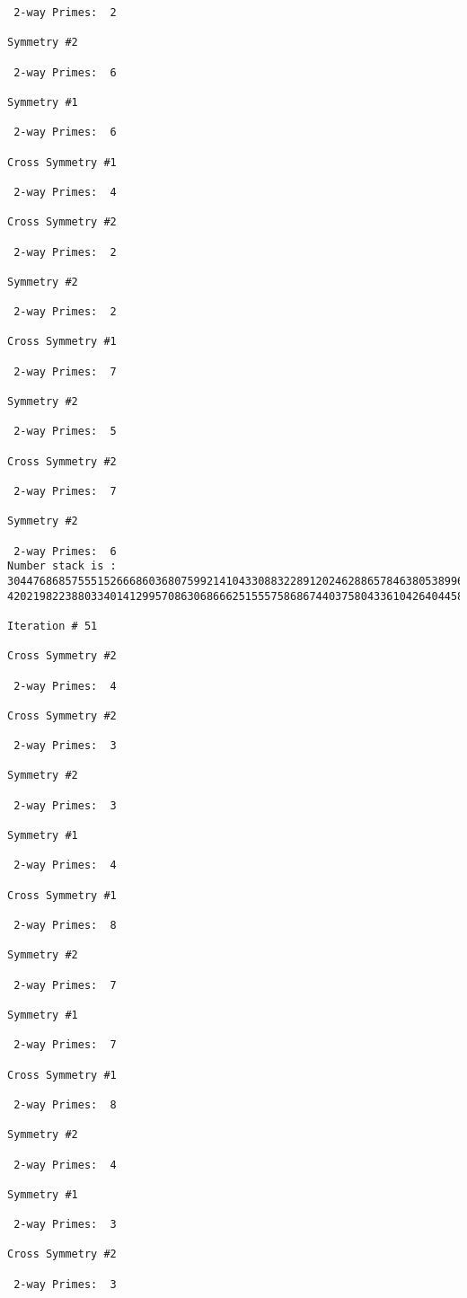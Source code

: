 {{{{\begin{verbatim}
 2-way Primes: 	2

Symmetry #2

 2-way Primes: 	6

Symmetry #1

 2-way Primes: 	6

Cross Symmetry #1

 2-way Primes: 	4

Cross Symmetry #2

 2-way Primes: 	2

Symmetry #2

 2-way Primes: 	2

Cross Symmetry #1

 2-way Primes: 	7

Symmetry #2

 2-way Primes: 	5

Cross Symmetry #2

 2-way Primes: 	7

Symmetry #2

 2-way Primes: 	6
Number stack is :
30447686857555152666860368075992141043308832289120246288657846380538996794608835958544046240163340857
42021982238803340141299570863068666251555758686744037580433610426404458595388064976998350836487568826

Iteration #	51

Cross Symmetry #2

 2-way Primes: 	4

Cross Symmetry #2

 2-way Primes: 	3

Symmetry #2

 2-way Primes: 	3

Symmetry #1

 2-way Primes: 	4

Cross Symmetry #1

 2-way Primes: 	8

Symmetry #2

 2-way Primes: 	7

Symmetry #1

 2-way Primes: 	7

Cross Symmetry #1

 2-way Primes: 	8

Symmetry #2

 2-way Primes: 	4

Symmetry #1

 2-way Primes: 	3

Cross Symmetry #2

 2-way Primes: 	3


\end{verbatim}}}}}
